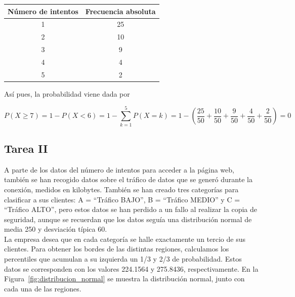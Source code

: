 \documentclass[12pt,a4paper,twoside,openright,titlepage,final]{article}
\begin{document}
\begin{table}[htbp]
\centering
\begin{tabular}{|c|c|}
\hline Número de intentos & Frecuencia absoluta \\ 
\hline 1 & 25 \\ 
\hline 2 & 10 \\ 
\hline 3 & 9 \\ 
\hline 4 & 4 \\ 
\hline 5 & 2 \\ 
\hline 
\end{tabular} 
\end{table}

Así pues, la probabilidad viene dada por

\[ P(X \geq 7) = 1 - P(X < 6) = 1 - \sum_{k=1}^{5} P(X = k) = 1 - \left(  \dfrac{25}{50} + \dfrac{10}{50} + \dfrac{9}{50} + \dfrac{4}{50} + \dfrac{2}{50} \right) = 0  \]

\subsection{Tarea II}

A parte de los datos del número de intentos para acceder a la página web, también se han recogido datos sobre el tráfico de datos que se generó durante la conexión, medidos en kilobytes. También se han creado tres categorías para clasificar a sus clientes: A = ``Tráfico BAJO'', B = ``Tráfico MEDIO'' y C = ``Tráfico ALTO'', pero estos datos se han perdido a un fallo al realizar la copia de seguridad, aunque se recuerdan que los datos seguía una distribución normal de media 250 y desviación típica 60.\\

La empresa desea que en cada categoría se halle exactamente un tercio de sus clientes. Para obtener los bordes de las distintas regiones, calculamos los percentiles que acumulan a su izquierda un 1/3 y 2/3 de probabilidad. Estos datos se corresponden con los valores 224.1564 y 275.8436, respectivamente. En la Figura~\ref{fig:distribucion_normal} se muestra la distribución normal, junto con cada una de las regiones.\\
\end{document}
